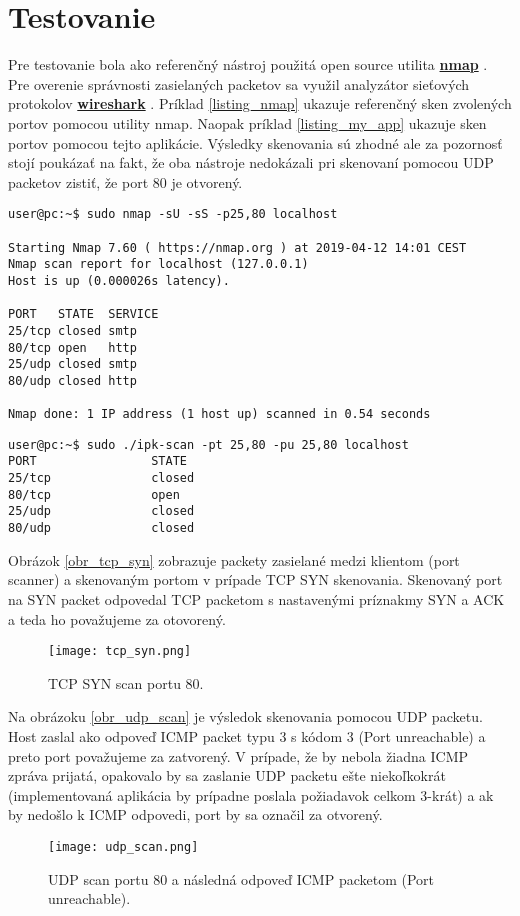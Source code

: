 \documentclass[a4paper, 11pt]{article}
\begin{document}
\section{Testovanie}
Pre testovanie bola ako referenčný nástroj použitá open source utilita \href{https://nmap.org/}{\textbf{nmap}} . Pre overenie správnosti zasielaných packetov sa využil analyzátor sieťových protokolov \href{https://www.wireshark.org/}{\textbf{wireshark}} . Príklad \ref{listing_nmap} ukazuje referenčný sken zvolených portov pomocou utility nmap. Naopak príklad \ref{listing_my_app} ukazuje sken portov pomocou tejto aplikácie. Výsledky skenovania sú zhodné ale za pozornosť stojí poukázať na fakt, že oba nástroje nedokázali pri skenovaní pomocou UDP packetov zistiť, že port 80 je otvorený.

\begin{lstlisting}[caption=Príklad skenovania pomocou utility nmap.]
user@pc:~$ sudo nmap -sU -sS -p25,80 localhost

Starting Nmap 7.60 ( https://nmap.org ) at 2019-04-12 14:01 CEST
Nmap scan report for localhost (127.0.0.1)
Host is up (0.000026s latency).

PORT   STATE  SERVICE
25/tcp closed smtp
80/tcp open   http
25/udp closed smtp
80/udp closed http

Nmap done: 1 IP address (1 host up) scanned in 0.54 seconds
\end{lstlisting}\label{listing_nmap}

\begin{lstlisting}[caption=Príklad skenovania portov touto aplikáciou.]
user@pc:~$ sudo ./ipk-scan -pt 25,80 -pu 25,80 localhost
PORT                STATE
25/tcp              closed
80/tcp              open
25/udp              closed
80/udp              closed
\end{lstlisting}\label{listing_my_app}

Obrázok \ref{obr_tcp_syn} zobrazuje packety zasielané medzi klientom (port scanner) a skenovaným portom v prípade TCP SYN skenovania. Skenovaný port na SYN packet odpovedal TCP packetom s nastavenými príznakmy SYN a ACK a teda ho považujeme za otovorený.
\begin{figure}[H] 
	\centering
	\texttt{[image: tcp\_syn.png]}
	\caption{TCP SYN scan portu 80.}
	\label{obr1}
\end{figure} \label{obr_tcp_syn}

Na obrázoku \ref{obr_udp_scan} je výsledok skenovania pomocou UDP packetu. Host zaslal ako odpoveď ICMP packet typu 3 s kódom 3 (Port unreachable) a preto port považujeme za zatvorený. V prípade, že by nebola žiadna ICMP zpráva prijatá, opakovalo by sa zaslanie UDP packetu ešte niekoľkokrát (implementovaná aplikácia by prípadne poslala požiadavok celkom 3-krát) a ak by nedošlo k ICMP odpovedi, port by sa označil za otvorený.

\begin{figure}[H] 
	\centering
	\texttt{[image: udp\_scan.png]}
	\caption{UDP scan portu 80 a následná odpoveď ICMP packetom (Port unreachable).}
	\label{obr1}
\end{figure} \label{obr_udp_scan}

\newpage


\end{document}
